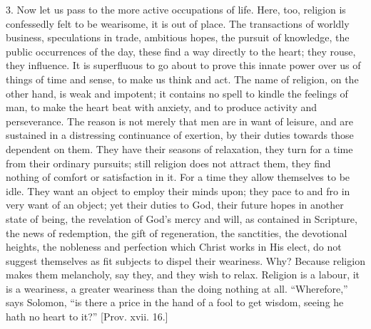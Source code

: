 3. Now let us pass to the more active occupations of life. Here,
too, religion is confessedly felt to be wearisome, it is out of place.
The transactions of worldly business, speculations in trade, ambitious
hopes, the pursuit of knowledge, the public occurrences of the day,
these find a way directly to the heart; they rouse, they influence. It
is superfluous to go about to prove this innate power over us of
things of time and sense, to make us think and act. The name of
religion, on the other hand, is weak and impotent; it contains no
spell to kindle the feelings of man, to make the heart beat with
anxiety, and to produce activity and perseverance. The reason is not
merely that men are in want of leisure, and are sustained in a
distressing continuance of exertion, by their duties towards those
dependent on them. They have their seasons of relaxation, they turn
for a time from their ordinary pursuits; still religion does not
attract them, they find nothing of comfort or satisfaction in it. For
a time they allow themselves to be idle. They want an object to employ
their minds upon; they pace to and fro in very want of an object; yet
their duties to God, their future hopes in another state of being, the
revelation of God's mercy and will, as contained in Scripture, the
news of redemption, the gift of regeneration, the sanctities, the
devotional heights, the nobleness and perfection which Christ works in
His elect, do not suggest themselves as fit subjects to dispel their
weariness. Why? Because religion makes them melancholy, say they, and
they wish to relax. Religion is a labour, it is a weariness, a greater
weariness than the doing nothing at all. ``Wherefore,'' says
Solomon, ``is there a price in the hand of a fool to get wisdom,
seeing he hath no heart to it?'' [Prov. xvii. 16.]

